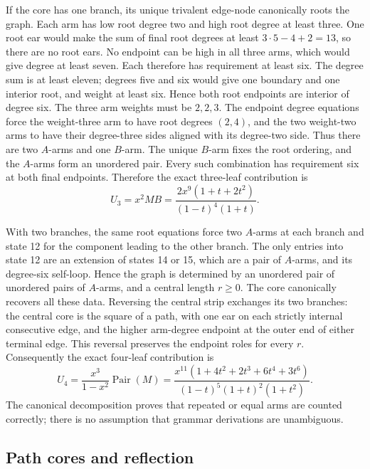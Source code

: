 If the core has one branch, its unique trivalent edge-node
canonically roots the graph.  Each arm has low root degree two
and high root degree at least three.  One root ear would make
the sum of final root degrees at least $3\cdot5-4+2=13$, so
there are no root ears.  No endpoint can be high in all three
arms, which would give degree at least seven.  Each therefore
has requirement at least six.  The degree sum is at least
eleven; degrees five and six would give one boundary and one
interior root, and weight at least six.  Hence both root
endpoints are interior of degree six.  The three arm
weights must be $2,2,3$.  The endpoint degree equations force
the weight-three arm to have root degrees $(2,4)$, and the
two weight-two arms to have their degree-three sides aligned
with its degree-two side.  Thus there are two $A$-arms and one
$B$-arm.  The unique $B$-arm fixes the root ordering, and the
$A$-arms form an unordered pair.  Every such combination has
requirement six at both final endpoints.  Therefore the exact
three-leaf contribution is
\begin{equation}
 U_3=x^2MB
 =\frac{2x^9(1+t+2t^2)}{(1-t)^4(1+t)}.
 \label{eq:count-u3}
\end{equation}

With two branches, the same root equations force two $A$-arms
at each branch and state 12 for the component leading to the
other branch.  The only entries into state 12 are an extension
of states 14 or 15, which are a pair of $A$-arms, and its
degree-six self-loop.  Hence the graph is determined by an
unordered pair of unordered pairs of $A$-arms, and a central
length $r\ge0$.  The core canonically recovers all these data.
Reversing the central strip exchanges its two branches: the
central core is the square of a path, with one ear on each
strictly internal consecutive edge, and the higher arm-degree
endpoint at the outer end of either terminal edge.  This
reversal preserves the endpoint roles for every $r$.
Consequently the exact four-leaf contribution is
\begin{equation}
 U_4=\frac{x^3}{1-x^2}\operatorname{Pair}(M)
 =\frac{x^{11}(1+4t^2+2t^3+6t^4+3t^6)}
 {(1-t)^5(1+t)^2(1+t^2)}.
 \label{eq:count-u4}
\end{equation}
The canonical decomposition proves that repeated or equal arms
are counted correctly; there is no assumption that grammar
derivations are unambiguous.

\subsection{Path cores and reflection}

